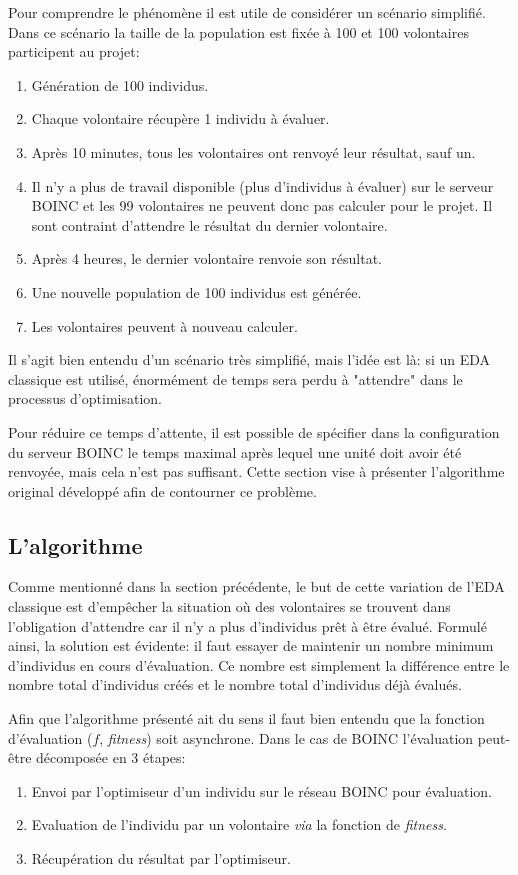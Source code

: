 \documentclass[a4paper, 11pt]{report}
\begin{document}
Pour comprendre le phénomène il est utile de considérer un scénario simplifié. Dans ce scénario la taille de la population est fixée à 100 et 100 volontaires participent au projet:
\begin{enumerate}[1)]
\item Génération de 100 individus.
\item Chaque volontaire récupère 1 individu à évaluer.
\item Après 10 minutes, tous les volontaires ont renvoyé leur résultat, sauf un.
\item Il n'y a plus de travail disponible (plus d'individus à évaluer) sur le serveur \textsc{BOINC} et les 99 volontaires ne peuvent donc pas calculer pour le projet. Il sont contraint d'attendre le résultat du dernier volontaire.
\item Après 4 heures, le dernier volontaire renvoie son résultat.
\item Une nouvelle population de 100 individus est générée.
\item Les volontaires peuvent à nouveau calculer.
\end{enumerate}
Il s'agit bien entendu d'un scénario très simplifié, mais l'idée est là: si un EDA classique est utilisé, énormément de temps sera perdu à "attendre" dans le processus d'optimisation. 

Pour réduire ce temps d'attente, il est possible de spécifier dans la configuration du serveur \textsc{BOINC} le temps maximal après lequel une unité doit avoir été renvoyée, mais cela n'est pas suffisant. Cette section vise à présenter l'algorithme original développé afin de contourner ce problème.

\subsection{L'algorithme}
Comme mentionné dans la section précédente, le but de cette variation de l'EDA classique est d'empêcher la situation où des volontaires se trouvent dans l'obligation d'attendre car il n'y a plus d'individus prêt à être évalué. Formulé ainsi, la solution est évidente: il faut essayer de maintenir un nombre minimum d'individus en cours d'évaluation. Ce nombre est simplement la différence entre le nombre total d'individus créés et le nombre total d'individus déjà évalués. 

Afin que l'algorithme présenté ait du sens il faut bien entendu que la fonction d'évaluation ($f$, \textit{fitness}) soit asynchrone. Dans le cas de \textsc{BOINC} l'évaluation peut-être décomposée en 3 étapes:
\begin{enumerate}[1)]
\item Envoi par l'optimiseur d'un individu sur le réseau \textsc{BOINC} pour évaluation.
\item Evaluation de l'individu par un volontaire \textit{via} la fonction de \textit{fitness}.
\item Récupération du résultat par l'optimiseur.
\end{enumerate}
\end{document}
